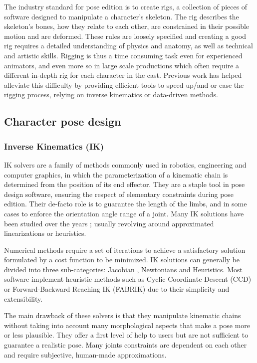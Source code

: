 The industry standard for pose edition is to create rigs, a collection of pieces of software designed to manipulate a character's skeleton. The rig describes the skeleton's bones, how they relate to each other, are constrained in their possible motion and are deformed. These rules are loosely specified and creating a good rig requires a detailed understanding of physics and anatomy, as well as technical and artistic skills. Rigging is thus a time consuming task even for experienced animators, and even more so in large scale productions which often require a different in-depth rig for each character in the cast.
Previous work has helped alleviate this difficulty by providing efficient tools to speed up/and or ease the rigging process, relying on inverse kinematics or data-driven methods.
\subsection{Character pose design}
\subsubsection{Inverse Kinematics (IK)}
IK solvers are a family of methods commonly used in robotics, engineering and computer graphics, in which the parameterization of a kinematic chain is determined from the position of its end effector.
They are a staple tool in pose design software, ensuring the respect of elementary constraints during pose edition. Their de-facto role is to guarantee the length of the limbs, and in some cases to enforce the orientation angle range of a joint.
Many IK solutions have been studied over the years \cite{aristidou_inverse_2018}; usually revolving around approximated linearizations or heuristics. 

Numerical methods require a set of iterations to achieve a satisfactory solution formulated by a cost function to be minimized.
IK solutions can generally be divided into three sub-categories: Jacobian \cite{Siciliano_Handbook_Robot_2007}, Newtonians \cite{cohen_ik_1996} and Heuristics. Most software implement heuristic methods such as Cyclic Coordinate Descent (CCD) \cite{wang_ccd_1991} or 
Forward-Backward Reaching IK (FABRIK) \cite{aristidou_fabrik:_2011} due to their simplicity and extensibility. 

The main drawback of 
these solvers is that they manipulate kinematic chains without taking into account many morphological aspects that make a pose more or less plausible. They offer a first level of help to users but are not sufficient to guarantee a realistic pose. Many joints constraints are dependent on each other and require subjective, human-made approximations.

